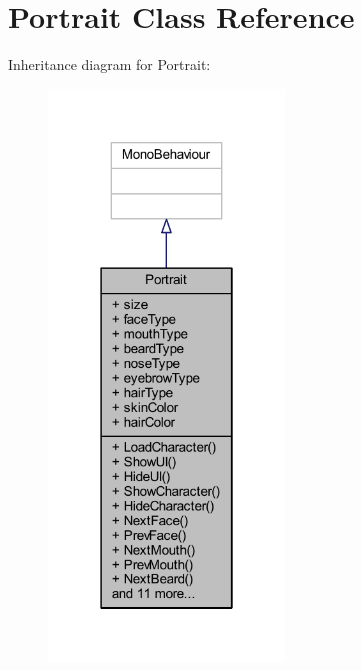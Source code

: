 \hypertarget{class_portrait}{}\section{Portrait Class Reference}
\label{class_portrait}


Inheritance diagram for Portrait\+:\nopagebreak
\begin{figure}[H]
\begin{center}
\leavevmode
\includegraphics[width=178pt]{class_portrait__inherit__graph}
\end{center}
\end{figure}


